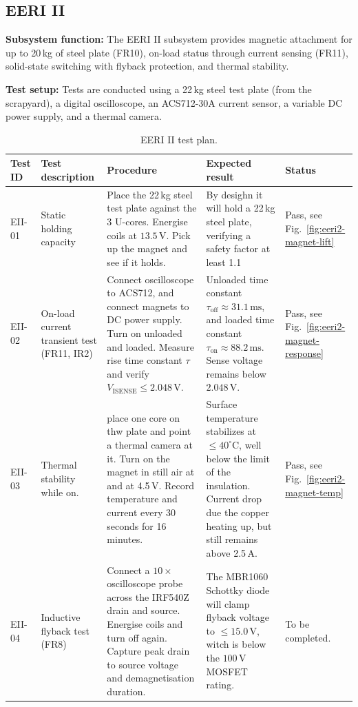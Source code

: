\subsection{EERI II}
\label{subsec:eeri-ii-tests}

\textbf{Subsystem function:}
The EERI II subsystem provides magnetic attachment for up to 20\,kg of steel plate (FR10),
on-load status through current sensing (FR11),
solid-state switching with flyback protection,
and thermal stability.

\textbf{Test setup:}
Tests are conducted using a 22\,kg steel test plate (from the scrapyard), a digital oscilloscope, an ACS712-30A current sensor,
a variable DC power supply,
and a thermal camera.

\begin{table}[htbp]
    \centering
    \small
    \caption{EERI II test plan.}
    \label{tab:eeri-ii-tests}
    \renewcommand{\arraystretch}{1.15}
    \begin{tabularx}{\textwidth}{|l|X|X|X|X|}
        \hline
        \textbf{Test ID} &
        \textbf{Test description} &
        \textbf{Procedure} &
        \textbf{Expected result} &
        \textbf{Status} \\
        \hline
        EII-01 & Static holding capacity &
        Place the 22\,kg steel test plate against the 3 U-cores. Energise coils at $13.5\,\text{V}$.
        Pick up the magnet and see if it holds. &
        By desighn it will hold a 22\,kg steel plate, verifying a safety factor at least 1.1&
        Pass, see Fig.~\ref{fig:eeri2-magnet-lift} \\
        \hline
        EII-02 & On-load current transient test (FR11, IR2) &
        Connect oscilloscope to ACS712, and connect magnets to DC power supply. Turn on unloaded and loaded.
        Measure rise time constant $\tau$ and verify $V_{\mathrm{ISENSE}} \le 2.048\,\text{V}$. &
        Unloaded time constant $\tau_{\mathrm{off}} \approx 31.1\,\text{ms}$, and loaded time constant $\tau_{\mathrm{on}} \approx 88.2\,\text{ms}$. Sense voltage remains below $2.048\,\text{V}$. &
        Pass, see Fig.~\ref{fig:eeri2-magnet-response} \\
        \hline
        EII-03 & Thermal stability while on. &
        place one core on thw plate and point a thermal camera at it. Turn on the magnet in still air at and at 4.5\,V.
        Record temperature and current every 30 seconds for 16 minutes. &
        Surface temperature stabilizes at $\le 40^\circ\text{C}$, well below the limit of the insulation.
        Current drop due the copper heating up, but still remains above 2.5\,A. &
        Pass, see Fig.~\ref{fig:eeri2-magnet-temp} \\
        \hline
        EII-04 & Inductive flyback test (FR8) &
        Connect a $10\times$ oscilloscope probe across the IRF540Z drain and source.
        Energise coils and turn off again. Capture peak drain to source voltage and demagnetisation duration. &
        The MBR1060 Schottky diode will clamp flyback voltage to $\le 15.0\,\text{V}$, witch is below the $100\,\text{V}$ MOSFET rating. &
        To be completed. \\
        \hline
    \end{tabularx}
\end{table}
